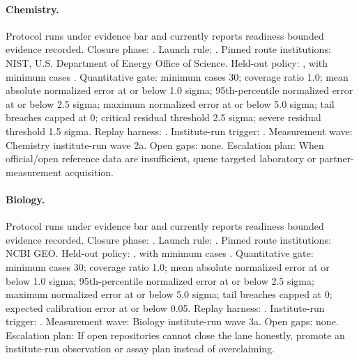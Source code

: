 \paragraph{Chemistry.}
Protocol  runs under evidence bar  and currently reports readiness bounded evidence recorded.
Closure phase: . Launch rule: .
Pinned route institutions: NIST, \allowbreak U.S. Department of Energy Office of Science.
Held-out policy: , with minimum cases .
Quantitative gate: minimum cases 30; coverage ratio 1.0; mean absolute normalized error at or below 1.0 sigma; 95th-percentile normalized error at or below 2.5 sigma; maximum normalized error at or below 5.0 sigma; tail breaches capped at 0; critical residual threshold 2.5 sigma; severe residual threshold 1.5 sigma.
Replay harness: .
Institute-run trigger: . Measurement wave: Chemistry institute-run wave 2a.
Open gaps: none.
Escalation plan: When official/open reference data are insufficient, queue targeted laboratory or partner-measurement acquisition.

\paragraph{Biology.}
Protocol  runs under evidence bar  and currently reports readiness bounded evidence recorded.
Closure phase: . Launch rule: .
Pinned route institutions: NCBI GEO.
Held-out policy: , with minimum cases .
Quantitative gate: minimum cases 30; coverage ratio 1.0; mean absolute normalized error at or below 1.0 sigma; 95th-percentile normalized error at or below 2.5 sigma; maximum normalized error at or below 5.0 sigma; tail breaches capped at 0; expected calibration error at or below 0.05.
Replay harness: .
Institute-run trigger: . Measurement wave: Biology institute-run wave 3a.
Open gaps: none.
Escalation plan: If open repositories cannot close the lane honestly, promote an institute-run observation or assay plan instead of overclaiming.

